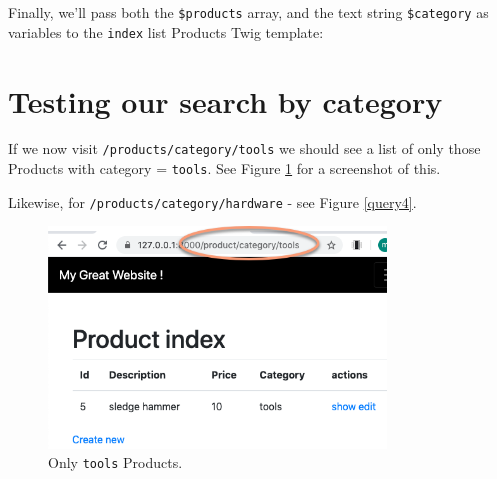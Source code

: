 \documentclass[a4paperpaper,openright]{book}
\newenvironment{Shaded}{}{}
\newcommand{\KeywordTok}[1]{\textcolor[rgb]{0.00,0.44,0.13}{\textbf{#1}}}
\newcommand{\NormalTok}[1]{#1}
\newcommand{\OtherTok}[1]{\textcolor[rgb]{0.00,0.44,0.13}{#1}}
\newcommand{\StringTok}[1]{\textcolor[rgb]{0.25,0.44,0.63}{#1}}
\begin{document}
Finally, we'll pass both the \texttt{\$products} array, and the text
string \texttt{\$category} as variables to the \texttt{index} list
Products Twig template:

\begin{Shaded}
\end{Shaded}

\hypertarget{testing-our-search-by-category}{%
\section{Testing our search by
category}\label{testing-our-search-by-category}}

If we now visit \texttt{/products/category/tools} we should see a list
of only those Products with category = \texttt{tools}. See Figure
\ref{query3} for a screenshot of this.

Likewise, for \texttt{/products/category/hardware} - see Figure
\ref{query4}.

\begin{figure}
\centering
\includegraphics[width=0.8\textwidth,height=\textheight]{./tex2pdf.-8a1528da847c818a/9514eae2fe53ea5066a6bfb263d5fac802af022a.png}
\caption{Only \texttt{tools} Products. \label{query3}}
\end{figure}
\end{document}
